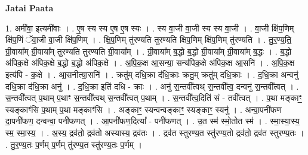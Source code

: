 \documentclass[17pt]{extarticle}
\begin{document}
\textbf{Jatai Paata} \newline

1. अमी॑वा॒ इत्यमी॑वाः । . ए॒ष स्य स्य ए॒ष ए॒ष स्यः । . स्य वा॒जी वा॒जी स्य स्य वा॒जी । . वा॒जी क्षि॑प॒णिम् क्षि॑प॒णिं ॅवा॒जी वा॒जी क्षि॑प॒णिम् । . क्षि॒प॒णिम् तु॑रण्यति तुरण्यति क्षिप॒णिम् क्षि॑प॒णिम् तु॑रण्यति । . तु॒र॒ण्य॒ति॒ ग्री॒वाया᳚म् ग्री॒वाया᳚म् तुरण्यति तुरण्यति ग्री॒वाया᳚म् । . ग्री॒वाया᳚म् ब॒द्धो ब॒द्धो ग्री॒वाया᳚म् ग्री॒वाया᳚म् ब॒द्धः । . ब॒द्धो अ॑पिक॒क्षे अ॑पिक॒क्षे ब॒द्धो ब॒द्धो अ॑पिक॒क्षे । . अ॒पि॒क॒क्ष आ॒सन्या॒ सन्य॑पिक॒क्षे अ॑पिक॒क्ष आ॒सनि॑ । . अ॒पि॒क॒क्ष इत्य॑पि - क॒क्षे । . आ॒सनीत्या॒सनि॑ । . क्रतु॑म् दधि॒क्रा द॑धि॒क्राः क्रतु॒म् क्रतु॑म् दधि॒क्राः । . द॒धि॒क्रा अन्वनु॑ दधि॒क्रा द॑धि॒क्रा अनु॑ । . द॒धि॒क्रा इति॑ दधि - क्राः । . अनु॑ स॒न्तवी᳚त्वथ् स॒न्तवी᳚त्व॒ दन्वनु॑ स॒न्तवी᳚त्वत् । . स॒न्तवी᳚त्वत् प॒थाम् प॒थाꣳ स॒न्तवी᳚त्वथ् स॒न्तवी᳚त्वत् प॒थाम् । . स॒न्तवी᳚त्व॒दिति॑ सं - तवी᳚त्वत् । . प॒था मङ्काꣳ॒॒ स्यङ्काꣳ॑सि प॒थाम् प॒था मङ्काꣳ॑सि । . अङ्काꣳ॒॒ स्यन्वन्वङ्काꣳ॒॒ स्यङ्काꣳ॒॒ स्यनु॑ । . अन्वा॒पनी॑फण दा॒पनी॑फण॒ दन्वन्वा॒ पनी॑फणत् । . आ॒पनी॑फण॒दित्या᳚ - पनी॑फणत् । . उ॒त स्म॑ स्मो॒तोत स्म॑ । . स्मा॒स्या॒स्य॒ स्म॒ स्मा॒स्य॒ । . अ॒स्य॒ द्रव॑तो॒ द्रव॑तो अस्यास्य॒ द्रव॑तः । . द्रव॑त स्तुरण्य॒त स्तु॑रण्य॒तो द्रव॑तो॒ द्रव॑त स्तुरण्य॒तः । . तु॒र॒ण्य॒तः प॒र्णम् प॒र्णम् तु॑रण्य॒त स्तु॑रण्य॒तः प॒र्णम् । \newline
\end{document}
